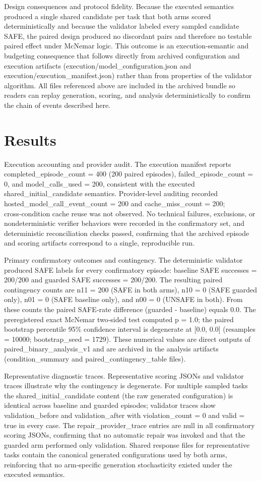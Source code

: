 \documentclass[conference]{IEEEtran}
\begin{document}
Design consequences and protocol fidelity. Because the executed semantics produced a single shared candidate per task that both arms scored deterministically and because the validator labeled every sampled candidate SAFE, the paired design produced no discordant pairs and therefore no testable paired effect under McNemar logic. This outcome is an execution‑semantic and budgeting consequence that follows directly from archived configuration and execution artifacts (execution/model\_configuration.json and execution/execution\_manifest.json) rather than from properties of the validator algorithm. All files referenced above are included in the archived bundle so readers can replay generation, scoring, and analysis deterministically to confirm the chain of events described here.

\section{Results}
Execution accounting and provider audit. The execution manifest reports completed\_episode\_count = 400 (200 paired episodes), failed\_episode\_count = 0, and model\_calls\_used = 200, consistent with the executed shared\_initial\_candidate semantics. Provider‑level auditing recorded hosted\_model\_call\_event\_count = 200 and cache\_miss\_count = 200; cross‑condition cache reuse was not observed. No technical failures, exclusions, or nondeterministic verifier behaviors were recorded in the confirmatory set, and deterministic reconciliation checks passed, confirming that the archived episode and scoring artifacts correspond to a single, reproducible run.

Primary confirmatory outcomes and contingency. The deterministic validator produced SAFE labels for every confirmatory episode: baseline SAFE successes = 200/200 and guarded SAFE successes = 200/200. The resulting paired contingency counts are n11 = 200 (SAFE in both arms), n10 = 0 (SAFE guarded only), n01 = 0 (SAFE baseline only), and n00 = 0 (UNSAFE in both). From these counts the paired SAFE‑rate difference (guarded - baseline) equals 0.0. The preregistered exact McNemar two‑sided test computed p = 1.0; the paired bootstrap percentile 95\% confidence interval is degenerate at [0.0, 0.0] (resamples = 10000; bootstrap\_seed = 1729). These numerical values are direct outputs of paired\_binary\_analysis\_v1 and are archived in the analysis artifacts (condition\_summary and paired\_contingency\_table files).

Representative diagnostic traces. Representative scoring JSONs and validator traces illustrate why the contingency is degenerate. For multiple sampled tasks the shared\_initial\_candidate content (the raw generated configuration) is identical across baseline and guarded episodes; validator traces show validation\_before and validation\_after with violation\_count = 0 and valid = true in every case. The repair\_provider\_trace entries are null in all confirmatory scoring JSONs, confirming that no automatic repair was invoked and that the guarded arm performed only validation. Shared response files for representative tasks contain the canonical generated configurations used by both arms, reinforcing that no arm‑specific generation stochasticity existed under the executed semantics.
\end{document}
